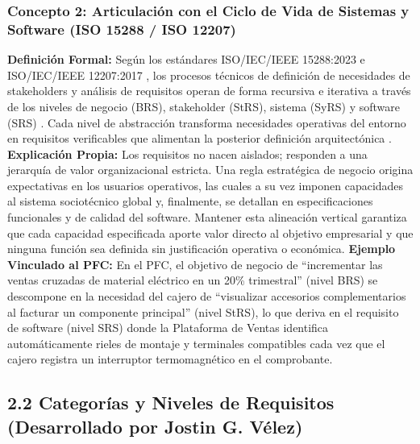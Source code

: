 \subsubsection{Concepto 2: Articulación con el Ciclo de Vida de Sistemas y Software (ISO 15288 / ISO 12207)}
\textbf{Definición Formal:} Según los estándares ISO/IEC/IEEE 15288:2023 \cite{ieee15288} e ISO/IEC/IEEE 12207:2017 \cite{ieee12207}, los procesos técnicos de definición de necesidades de stakeholders y análisis de requisitos operan de forma recursiva e iterativa a través de los niveles de negocio (BRS), stakeholder (StRS), sistema (SyRS) y software (SRS) \cite{ieee29148}. Cada nivel de abstracción transforma necesidades operativas del entorno en requisitos verificables que alimentan la posterior definición arquitectónica \cite{ieee12207, hull2011}.
\textbf{Explicación Propia:} Los requisitos no nacen aislados; responden a una jerarquía de valor organizacional estricta. Una regla estratégica de negocio origina expectativas en los usuarios operativos, las cuales a su vez imponen capacidades al sistema sociotécnico global y, finalmente, se detallan en especificaciones funcionales y de calidad del software. Mantener esta alineación vertical garantiza que cada capacidad especificada aporte valor directo al objetivo empresarial y que ninguna función sea definida sin justificación operativa o económica.
\textbf{Ejemplo Vinculado al PFC:} En el PFC, el objetivo de negocio de ``incrementar las ventas cruzadas de material eléctrico en un 20\% trimestral'' (nivel BRS) se descompone en la necesidad del cajero de ``visualizar accesorios complementarios al facturar un componente principal'' (nivel StRS), lo que deriva en el requisito de software (nivel SRS) donde la Plataforma de Ventas identifica automáticamente rieles de montaje y terminales compatibles cada vez que el cajero registra un interruptor termomagnético en el comprobante.
\subsection{2.2 Categorías y Niveles de Requisitos (Desarrollado por Jostin G. Vélez)}
